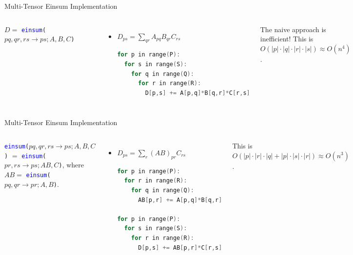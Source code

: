 \documentclass[aspectratio=169,10pt]{beamer}
\newcommand{\ein}[1]{\texttt{\textcolor{blue}{einsum}(#1)}}
\begin{document}
\begin{frame}[fragile]{Multi-Tensor Einsum Implementation}

\begin{columns}
$D =$ \ein{$pq,qr,rs \to ps; A, B, C$}
\begin{itemize}
	\item $D_{ps} = \sum_{qr} A_{pq}B_{qr}C_{rs}$
	\begin{lstlisting}[language=C]
for p in range(P):
  for s in range(S):
    for q in range(Q):
      for r in range(R):
        D[p,s] += A[p,q]*B[q,r]*C[r,s]
\end{lstlisting}
\end{itemize}
\pause
The naive approach is inefficient!
This is $O(|p| \cdot |q| \cdot |r| \cdot |s|) \approx O(n^4)$.
\end{columns}
\end{frame}

\begin{frame}[fragile]{Multi-Tensor Einsum Implementation}

\begin{columns}
\ein{$pq,qr,rs \to ps; A, B, C$} $=$ \ein{$pr, rs \to ps; AB, C$}, where $AB =$ \ein{$pq,qr \to pr; A, B$}.
\begin{itemize}
	\item $D_{ps} = \sum_{r} (AB)_{pr}C_{rs}$
	\begin{lstlisting}[language=C]
for p in range(P):
  for r in range(R):
    for q in range(Q):
      AB[p,r] += A[p,q]*B[q,r]
 
for p in range(P):
  for s in range(S):
    for r in range(R):
      D[p,s] += AB[p,r]*C[r,s]
\end{lstlisting}
\end{itemize}
\pause
This is $O(|p| \cdot |r| \cdot |q| + |p| \cdot |s| \cdot |r|) \approx O(n^3)$.
\end{columns}
\end{frame}
\end{document}
